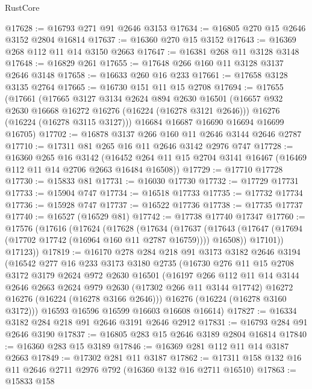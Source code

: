\begin{lexlean}{RustCore}
\begin{coremodule}
@17628 := @16793 @271 @91 @2646 @3153
@17634 := @16805 @270 @15 @2646 @3152 @2804 @16814
@17637 := @16360 @270 @15 @3152
@17643 := @16369 @268 @112 @11 @14 @3150 @2663
@17647 := @16381 @268 @11 @3128 @3148
@17648 := @16829 @261
@17655 := @17648 @266 @160 @11 @3128 @3137 @2646 @3148
@17658 := @16633 @260 @16 @233
@17661 := @17658 @3128 @3135 @2764
@17665 := @16730 @151 @11 @15 @2708
@17694 := @17655
    (@17661
      (@17665
        @3127
        @3134
        @2624
        @894
        @2630
        @16501
        (@16657 @932 @2630 @16668 @16272 @16276 (@16224 (@16278 @3121 @2646)))
        @16276
        (@16224 (@16278 @3115 @3127)))
      @16684
      @16687
      @16690
      @16694
      @16699
      @16705)
@17702 := @16878 @3137 @266 @160 @11 @2646 @3144 @2646 @2787
@17710 := @17311 @81 @265 @16 @11 @2646 @3142 @2976 @747
@17728 := @16360
    @265
    @16
    @3142
    (@16452 @264 @11 @15 @2704 @3141 @16467 (@16469 @112 @11 @14 @2706 @2663 @16484 @16508))
@17729 := @17710 @17728
@17730 := @15833 @81
@17731 := @16030 @17730
@17732 := @17729 @17731
@17733 := @15904 @747
@17734 := @16518 @17733
@17735 := @17732 @17734
@17736 := @15928 @747
@17737 := @16522 @17736
@17738 := @17735 @17737
@17740 := @16527 (@16529 @81)
@17742 := @17738 @17740 @17347
@17760 := @17576
    (@17616
      (@17624
        (@17628
          (@17634
            (@17637
              (@17643 (@17647 (@17694 (@17702 @17742 (@16964 @160 @11 @2787 @16759)))) @16508))
            @17101))
        @17123))
@17819 := @16170
    @278
    @284
    @218
    @91
    @3173
    @3182
    @2646
    @3194
    (@16542
      @277
      @16
      @233
      @3173
      @3180
      @2735
      (@16730
        @276
        @11
        @15
        @2708
        @3172
        @3179
        @2624
        @972
        @2630
        @16501
        (@16197
          @266
          @112
          @11
          @14
          @3144
          @2646
          @2663
          @2624
          @979
          @2630
          (@17302 @266 @11 @3144 @17742)
          @16272
          @16276
          (@16224 (@16278 @3166 @2646)))
        @16276
        (@16224 (@16278 @3160 @3172)))
      @16593
      @16596
      @16599
      @16603
      @16608
      @16614)
@17827 := @16334 @3182 @284 @218 @91 @2646 @3191 @2646 @2912
@17831 := @16793 @284 @91 @2646 @3190
@17837 := @16805 @283 @15 @2646 @3189 @2804 @16814
@17840 := @16360 @283 @15 @3189
@17846 := @16369 @281 @112 @11 @14 @3187 @2663
@17849 := @17302 @281 @11 @3187
@17862 := @17311 @158 @132 @16 @11 @2646 @2711 @2976 @792 (@16360 @132 @16 @2711 @16510)
@17863 := @15833 @158

\end{coremodule}
\end{lexlean}
